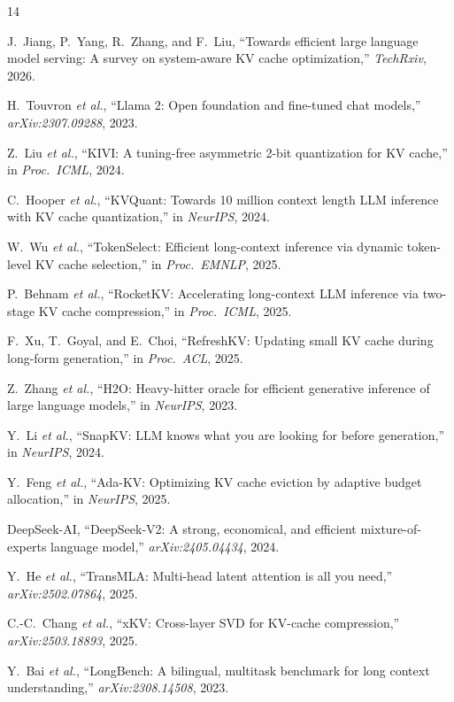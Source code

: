 \documentclass[conference]{IEEEtran}
\begin{document}
\begin{thebibliography}{14}

J.~Jiang, P.~Yang, R.~Zhang, and F.~Liu,
``Towards efficient large language model serving: A survey on
system-aware KV cache optimization,''
\textit{TechRxiv}, 2026.

H.~Touvron \textit{et al.},
``Llama 2: Open foundation and fine-tuned chat models,''
\textit{arXiv:2307.09288}, 2023.

Z.~Liu \textit{et al.},
``KIVI: A tuning-free asymmetric 2-bit quantization for KV cache,''
in \textit{Proc.\ ICML}, 2024.

C.~Hooper \textit{et al.},
``KVQuant: Towards 10 million context length LLM inference with KV
cache quantization,''
in \textit{NeurIPS}, 2024.

W.~Wu \textit{et al.},
``TokenSelect: Efficient long-context inference via dynamic token-level
KV cache selection,''
in \textit{Proc.\ EMNLP}, 2025.

P.~Behnam \textit{et al.},
``RocketKV: Accelerating long-context LLM inference via two-stage KV
cache compression,''
in \textit{Proc.\ ICML}, 2025.

F.~Xu, T.~Goyal, and E.~Choi,
``RefreshKV: Updating small KV cache during long-form generation,''
in \textit{Proc.\ ACL}, 2025.

Z.~Zhang \textit{et al.},
``H2O: Heavy-hitter oracle for efficient generative inference of large
language models,''
in \textit{NeurIPS}, 2023.

Y.~Li \textit{et al.},
``SnapKV: LLM knows what you are looking for before generation,''
in \textit{NeurIPS}, 2024.

Y.~Feng \textit{et al.},
``Ada-KV: Optimizing KV cache eviction by adaptive budget allocation,''
in \textit{NeurIPS}, 2025.

DeepSeek-AI,
``DeepSeek-V2: A strong, economical, and efficient mixture-of-experts
language model,''
\textit{arXiv:2405.04434}, 2024.

Y.~He \textit{et al.},
``TransMLA: Multi-head latent attention is all you need,''
\textit{arXiv:2502.07864}, 2025.

C.-C.~Chang \textit{et al.},
``xKV: Cross-layer SVD for KV-cache compression,''
\textit{arXiv:2503.18893}, 2025.

Y.~Bai \textit{et al.},
``LongBench: A bilingual, multitask benchmark for long context
understanding,''
\textit{arXiv:2308.14508}, 2023.

\end{thebibliography}
\end{document}
